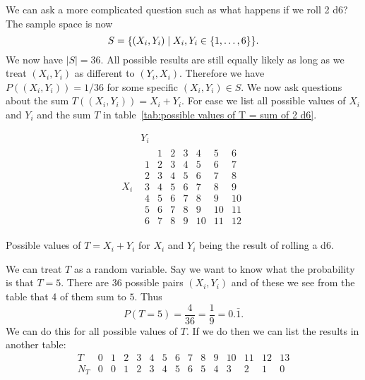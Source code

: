    We can ask a more complicated question such as what happens if we roll 2 d6?
    The sample space is now
    \[S = \{(X_i, Y_i)\mid X_i, Y_i\in\{1, \dotsc, 6\}\}.\]
    We now have \(|S| = 36\).
    All possible results are still equally likely as long as we treat \((X_i, Y_i)\) as different to \((Y_i, X_i)\).
    Therefore we have \(P((X_i, Y_i)) = 1/36\) for some specific \((X_i, Y_i)\in S\).
    We now ask questions about the sum \(T((X_i, Y_i)) = X_i + Y_i\).
    For ease we list all possible values of \(X_i\) and \(Y_i\) and the sum \(T\) in table~\ref{tab:possible values of T = sum of 2 d6}.
    \begin{table}[ht]
        \centering
        \[
            \begin{array}{cc}
                & Y_i\\
                X_i &
                \begin{array}{c|cccccc}
                       & 1 & 2 & 3 & 4 & 5 & 6\\\hline
                     1 & 2 & 3 & 4 & 5 & 6 & 7\\
                     2 & 3 & 4 & 5 & 6 & 7 & 8\\
                     3 & 4 & 5 & 6 & 7 & 8 & 9\\
                     4 & 5 & 6 & 7 & 8 & 9 & 10\\
                     5 & 6 & 7 & 8 & 9 & 10 & 11\\
                     6 & 7 & 8 & 9 & 10 & 11 & 12
                \end{array}
            \end{array}
        \]
        \caption{Possible values of \(T = X_i + Y_i\) for \(X_i\) and \(Y_i\) being the result of rolling a d6.}
        \label{tab:possible values of T = sum of 2 d6}
    \end{table}
    We can treat \(T\) as a random variable.
    Say we want to know what the probability is that \(T = 5\).
    There are 36 possible pairs \((X_i, Y_i)\) and of these we see from the table that 4 of them sum to \(5\).
    Thus
    \[P(T = 5) = \frac{4}{36} = \frac{1}{9} = 0.\bar{1}.\]
    We can do this for all possible values of \(T\).
    If we do then we can list the results in another table:
    \[
        \begin{array}{c|cccccccccccccc}
            T & 0 & 1 & 2 & 3 & 4 & 5 & 6 & 7 & 8 & 9 & 10 & 11 & 12 & 13\\\hline
            N_T & 0 & 0 & 1 & 2 & 3 & 4 & 5 & 6 & 5 & 4 & 3 & 2 & 1 & 0
        \end{array}
    \]
